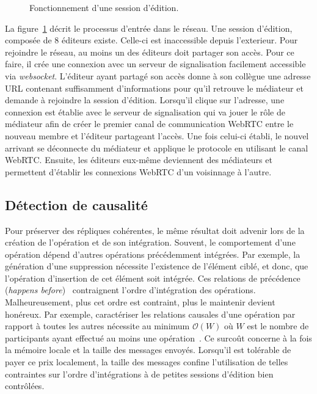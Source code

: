 \begin{figure}
  \begin{center}
    
    \caption[Fonctionnement d'une session d'édition]
    {\label{editor:fig:entering}Fonctionnement d'une session d'édition.}
  \end{center}
\end{figure}

La figure~\ref{editor:fig:entering} décrit le processus d'entrée dans le réseau.
Une session d'édition, composée de 8 éditeurs existe. Celle-ci est inaccessible
depuis l'exterieur. Pour rejoindre le réseau, au moins un des éditeurs doit
partager son accès. Pour ce faire, il crée une connexion avec un serveur de
signalisation facilement accessible via \emph{websocket}. L'éditeur ayant
partagé son accès donne à son collègue une adresse URL contenant suffisamment
d'informations pour qu'il retrouve le médiateur et demande à rejoindre la
session d'édition. Lorsqu'il clique sur l'adresse, une connexion est établie
avec le serveur de signalisation qui va jouer le rôle de médiateur afin de créer
le premier canal de communication WebRTC entre le nouveau membre et l'éditeur
partageant l'accès. Une fois celui-ci établi, le nouvel arrivant se déconnecte
du médiateur et applique le protocole \SPRAY en utilisant le canal
WebRTC. Ensuite, les éditeurs eux-même deviennent des médiateurs et permettent
d'établir les connexions WebRTC d'un voisinnage à l'autre.

\subsection{Détection de causalité}

Pour préserver des répliques cohérentes, le même résultat doit advenir lors de
la création de l'opération et de son intégration. Souvent, le comportement d'une
opération dépend d'autres opérations précédemment intégrées. Par exemple, la
génération d'une suppression nécessite l'existence de l'élément ciblé, et donc,
que l'opération d'insertion de cet élément soit intégrée. Ces relations de
précédence (\emph{happens before})~\cite{lamport1978time} contraignent l'ordre
d'intégration des opérations.  Malheureusement, plus cet ordre est contraint,
plus le maintenir devient honéreux. Par exemple, caractériser les relations
causales d'une opération par rapport à toutes les autres nécessite au minimum
$\mathcal{O}(W)$ où $W$ est le nombre de participants ayant effectué au moins
une opération~\cite{charronbost1991concerning}. Ce surcoût concerne à la fois la
mémoire locale et la taille des messages envoyés. Lorsqu'il est tolérable de
payer ce prix localement, la taille des messages confine l'utilisation de telles
contraintes sur l'ordre d'intégrations à de petites sessions d'édition bien
contrôlées.

